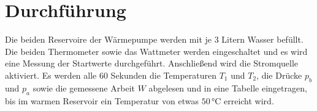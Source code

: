 \section{Durchführung}
\label{sec:Durchführung}
Die beiden Reservoire der Wärmepumpe werden mit je 3 Litern Wasser befüllt. Die beiden Thermometer sowie das Wattmeter werden eingeschaltet und es wird eine Messung der Startwerte durchgeführt.
Anschließend wird die Stromquelle aktiviert. Es werden alle 60 Sekunden die Temperaturen $T_1$ und $T_2$, die Drücke $p_b$ und $p_a$ sowie die gemessene Arbeit $W$ abgelesen und in eine Tabelle eingetragen, bis im warmen Reservoir ein Temperatur von etwas $50\, \unit{\celsius}$ erreicht wird.

